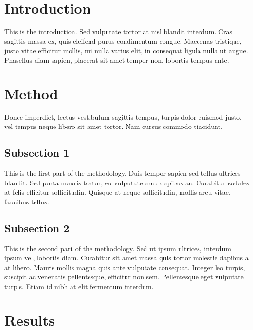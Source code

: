 \documentclass[12pt,a4paper,]{report}
\begin{document}
\hypertarget{introduction-2}{%
\section{Introduction}\label{introduction-2}}

This is the introduction. Sed vulputate tortor at nisl blandit interdum.
Cras sagittis massa ex, quis eleifend purus condimentum congue. Maecenas
tristique, justo vitae efficitur mollis, mi nulla varius elit, in
consequat ligula nulla ut augue. Phasellus diam sapien, placerat sit
amet tempor non, lobortis tempus ante.

\hypertarget{method-1}{%
\section{Method}\label{method-1}}

Donec imperdiet, lectus vestibulum sagittis tempus, turpis dolor euismod
justo, vel tempus neque libero sit amet tortor. Nam cursus commodo
tincidunt.

\hypertarget{subsection-1}{%
\subsection{Subsection 1}\label{subsection-1}}

This is the first part of the methodology. Duis tempor sapien sed tellus
ultrices blandit. Sed porta mauris tortor, eu vulputate arcu dapibus ac.
Curabitur sodales at felis efficitur sollicitudin. Quisque at neque
sollicitudin, mollis arcu vitae, faucibus tellus.

\hypertarget{subsection-2-1}{%
\subsection{Subsection 2}\label{subsection-2-1}}

This is the second part of the methodology. Sed ut ipsum ultrices,
interdum ipsum vel, lobortis diam. Curabitur sit amet massa quis tortor
molestie dapibus a at libero. Mauris mollis magna quis ante vulputate
consequat. Integer leo turpis, suscipit ac venenatis pellentesque,
efficitur non sem. Pellentesque eget vulputate turpis. Etiam id nibh at
elit fermentum interdum.

\hypertarget{results-1}{%
\section{Results}\label{results-1}}
\end{document}
